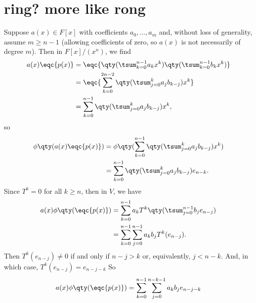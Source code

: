 \documentclass[12pt]{article}
\begin{document}
\section{ring? more like rong}

Suppose $a(x) \in F[x]$ with coefficients $a_0, \dots, a_m$ and, without loss of generality, assume $m \geq n-1$ (allowing coefficients of zero, so $a(x)$ is not necessarily of degree $m$). Then in $F[x]/(x^n)$, we find
    \begin{align*}
        a(x)\eqc{p(x)}
            &= \eqc{\qty(\tsum_{k=0}^{n-1} a_{k} x^k)\qty(\tsum_{k=0}^{n-1} b_k x^k)} \\
            &= \eqc{\sum_{k=0}^{2n-2} \qty(\tsum_{j=0}^{k} a_j b_{k-j})x^k} \\
            &= \sum_{k=0}^{n-1} \qty(\tsum_{j=0}^{k} a_j b_{k-j})x^k,
    \end{align*}
    so
    \begin{align*}
        \phi\qty(a(x)\eqc{p(x)})
            &= \phi\qty(\sum_{k=0}^{n-1} \qty(\tsum_{j=0}^{k} a_j b_{k-j})x^k) \\
            &= \sum_{k=0}^{n-1} \qty(\tsum_{j=0}^{k} a_j b_{k-j}) e_{n-k}.
    \end{align*}
    Since $T^k = 0$ for all $k \geq n$, then in $V$, we have
    \begin{align*}
        a(x)\phi\qty(\eqc{p(x)})
            &= \sum_{k=0}^{n-1} a_k T^k\qty(\tsum_{j=0}^{n-1}b_j e_{n-j}) \\
            &= \sum_{k=0}^{n-1} \sum_{j=0}^{n-1} a_k b_j T^k(e_{n-j}).
    \end{align*}
    Then $T^k(e_{n-j}) \ne 0$ if and only if $n-j > k$ or, equivalently, $j < n-k$. And, in which case, $T^k(e_{n-j}) = e_{n-j-k}$ So
    \begin{align*}
        a(x)\phi\qty(\eqc{p(x)})
            &= \sum_{k=0}^{n-1} \sum_{j=0}^{n-k-1} a_k b_j e_{n-j-k} \\
    \end{align*}
\end{document}
